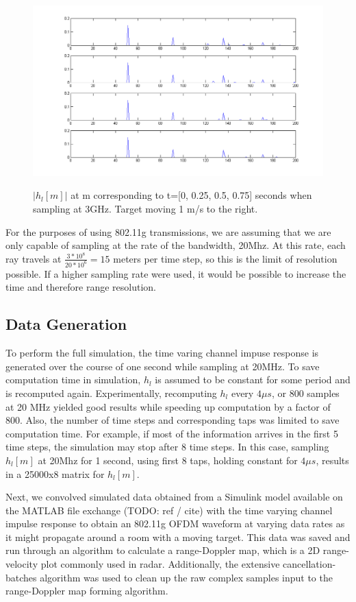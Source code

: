 \documentclass[article,11pt,onecolumn,final]{IEEEtran}
\begin{document}
\begin{figure}
\caption{$|h_l[m]|$ at m corresponding to t=[0, 0.25, 0.5, 0.75] seconds when sampling at 3GHz. Target moving 1 m/s to the right. }
\centering
\includegraphics[width=400pt]{sim/impulse_response_taps.png}  
\label{fig:Impulse Response}
\end{figure}

For the purposes of using 802.11g transmissions, we are assuming that we are only capable of sampling at the rate of the bandwidth, 20Mhz. At this rate, each ray travels at $\frac{3*10^8}{20*10^6} = 15$ meters per time step, so this is the limit of resolution possible. If a higher sampling rate were used, it would be possible to increase the time and therefore range resolution.

\subsection{Data Generation}
To perform the full simulation, the time varing channel impuse response is generated over the course of one second while sampling at 20MHz. To save computation time in simulation, $h_l$ is assumed to be constant for some period and is recomputed again. Experimentally, recomputing $h_l$ every $4 \mu s$, or 800 samples at 20 MHz yielded good results while speeding up computation by a factor of 800. Also, the number of time steps and corresponding taps was limited to save computation time. For example, if most of the information arrives in the first 5 time steps, the simulation may stop after 8 time steps. In this case, sampling $h_l[m]$ at 20Mhz for 1 second, using first 8 taps, holding constant for $4 \mu s$, results in a 25000x8 matrix for $h_l[m]$.

Next, we convolved simulated data obtained from a Simulink model available on the MATLAB file exchange (TODO: ref / cite) with the time varying channel impulse response to obtain an 802.11g OFDM waveform at varying data rates as it might propagate around a room with a moving target. This data was saved and run through an algorithm to calculate a range-Doppler map, which is a 2D range-velocity plot commonly used in radar. Additionally, the extensive cancellation-batches algorithm was used to clean up the raw complex samples input to the range-Doppler map forming algorithm.
\end{document}
